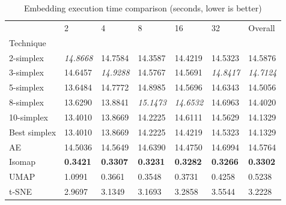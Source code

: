 \begin{table}
\caption{Embedding execution time comparison (seconds, lower is better)}
\label{tab:results_embed_time}
\begin{center}
\begin{tabular}{lllllll}
\toprule
 & 2 & 4 & 8 & 16 & 32 & Overall \\
Technique &  &  &  &  &  &  \\
\midrule
2-simplex & \textit{14.8668} & 14.7584 & 14.3587 & 14.4219 & 14.5323 & 14.5876 \\
3-simplex & 14.6457 & \textit{14.9288} & 14.5767 & 14.5691 & \textit{14.8417} & \textit{14.7124} \\
5-simplex & 13.6484 & 14.7772 & 14.8985 & 14.5696 & 14.6343 & 14.5056 \\
8-simplex & 13.6290 & 13.8841 & \textit{15.1473} & \textit{14.6532} & 14.6963 & 14.4020 \\
10-simplex & 13.4010 & 13.8669 & 14.2225 & 14.6111 & 14.5629 & 14.1329 \\
Best simplex & 13.4010 & 13.8669 & 14.2225 & 14.4219 & 14.5323 & 14.1329 \\
AE & 14.5036 & 14.5649 & 14.6390 & 14.4750 & 14.6994 & 14.5764 \\
Isomap & \textbf{0.3421} & \textbf{0.3307} & \textbf{0.3231} & \textbf{0.3282} & \textbf{0.3266} & \textbf{0.3302} \\
UMAP & 1.0991 & 0.3661 & 0.3548 & 0.3731 & 0.4258 & 0.5238 \\
t-SNE & 2.9697 & 3.1349 & 3.1693 & 3.2858 & 3.5544 & 3.2228 \\
\bottomrule
\end{tabular}
\end{center}
\end{table}
